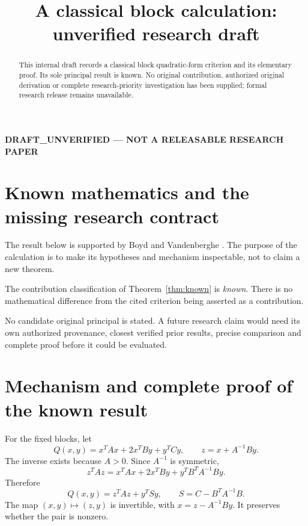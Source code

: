 \documentclass[12pt,reqno]{amsart}
\title{A classical block calculation: unverified research draft}
\date{}
\begin{document}
\maketitle
{}

\begin{center}
\textbf{DRAFT\_UNVERIFIED --- NOT A RELEASABLE RESEARCH PAPER}
\end{center}
\begin{abstract}
This internal draft records a classical block quadratic-form criterion
and its elementary proof. Its sole principal result is known. No original
contribution, authorized original derivation or complete research-priority
investigation has been supplied; formal research release remains unavailable.
\end{abstract}

\section{Known mathematics and the missing research contract}
The result below is supported by Boyd and Vandenberghe
\cite[Appendix A.5.5]{S-Boyd}. The purpose of the calculation is to make
its hypotheses and mechanism inspectable, not to claim a new theorem.

\begin{theorem}\label{thm:known}

\end{theorem}

The contribution classification of Theorem~\ref{thm:known} is
\emph{known}. There is no mathematical difference from the cited
criterion being asserted as a contribution.

No candidate original principal is stated. A future research claim would
need its own authorized provenance, closest verified prior results,
precise comparison and complete proof before it could be evaluated.

\section{Mechanism and complete proof of the known result}
For the fixed blocks, let
\[
 Q(x,y)=x^TAx+2x^TBy+y^TCy,\qquad z=x+A^{-1}By.
\]
The inverse exists because $A>0$. Since $A^{-1}$ is symmetric,
\[
 z^TAz=x^TAx+2x^TBy+y^TB^TA^{-1}By.
\]
Therefore
\begin{equation}\label{eq:known-square}
 Q(x,y)=z^TAz+y^TSy,\qquad S=C-B^TA^{-1}B.
\end{equation}
The map $(x,y)\mapsto(z,y)$ is invertible, with
$x=z-A^{-1}By$. It preserves whether the pair is nonzero.
\end{document}
